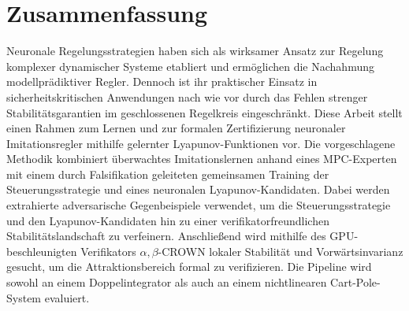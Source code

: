 \chapter*{Zusammenfassung}
\label{ch:zusammenfassung}

Neuronale Regelungsstrategien haben sich als wirksamer Ansatz zur Regelung
komplexer dynamischer Systeme etabliert und ermöglichen die Nachahmung modellprädiktiver Regler.
Dennoch ist ihr praktischer Einsatz in sicherheitskritischen Anwendungen nach wie vor durch das
Fehlen strenger Stabilitätsgarantien im geschlossenen Regelkreis eingeschränkt.
Diese Arbeit stellt einen Rahmen zum Lernen und zur formalen Zertifizierung neuronaler Imitationsregler
mithilfe gelernter Lyapunov-Funktionen vor.
Die vorgeschlagene Methodik kombiniert überwachtes Imitationslernen anhand eines MPC-Experten mit einem durch 
Falsifikation geleiteten gemeinsamen Training der Steuerungsstrategie und eines neuronalen Lyapunov-Kandidaten. 
Dabei werden extrahierte adversarische Gegenbeispiele verwendet, um die Steuerungsstrategie und den Lyapunov-Kandidaten 
hin zu einer verifikatorfreundlichen Stabilitätslandschaft zu verfeinern. 
Anschließend wird mithilfe des GPU-beschleunigten Verifikators $\alpha,\beta$-CROWN lokaler Stabilität und 
Vorwärtsinvarianz gesucht, um die Attraktionsbereich formal zu verifizieren. 
Die Pipeline wird sowohl an einem Doppelintegrator als auch an einem nichtlinearen Cart-Pole-System evaluiert.
